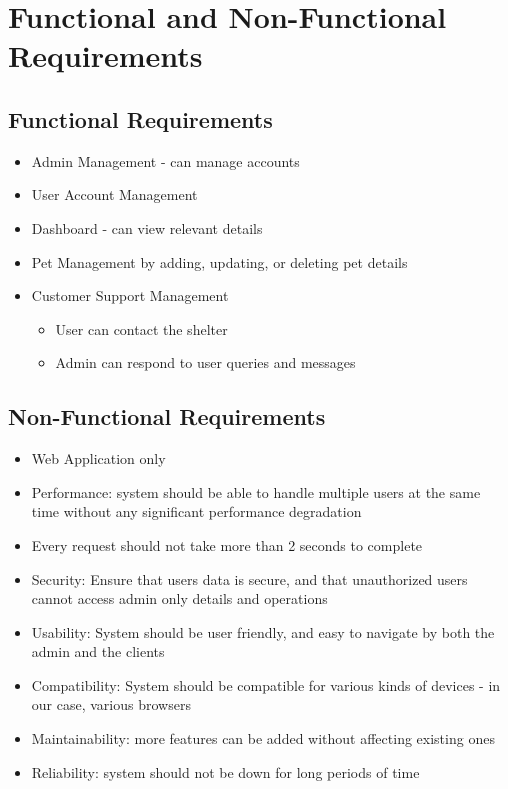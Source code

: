 \section{Functional and Non-Functional Requirements}
\subsection{Functional Requirements}
\begin{itemize}
    \item Admin Management - can manage accounts
    \item User Account Management
    \item Dashboard - can view relevant details
    \item Pet Management by adding, updating, or deleting pet details
    \item Customer Support Management \begin{itemize}
        \item User can contact the shelter
        \item Admin can respond to user queries and messages
    \end{itemize}
\end{itemize}

\subsection{Non-Functional Requirements}
\begin{itemize}
    \item Web Application only
    \item Performance: system should be able to handle multiple users at the same time without any significant performance degradation
    \item Every request should not take more than 2 seconds to complete
    \item Security: Ensure that users data is secure, and that unauthorized users cannot access admin only details and operations
    \item Usability: System should be user friendly, and easy to navigate by both the admin and the clients
    \item Compatibility: System should be compatible for various kinds of devices - in our case, various browsers
    \item Maintainability: more features can be added without affecting existing ones
    \item Reliability: system should not be down for long periods of time
\end{itemize}